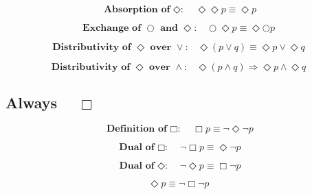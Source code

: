 \documentclass[fleqn, leqno]{article}
\newcommand{\Next}{\bigcirc}
\newcommand{\Event}{\Diamond}
\newcommand{\Always}{\Box}
\newcommand{\spacer}{\vspace{-30pt}}
\newcommand{\firstspacer}{\vspace{-26pt}}
\begin{document}
\spacer

\begin{equation}\label{E:IdemEvent}
\textbf{Absorption of $\Event$:}\quad \Event\Event p \equiv \Event p
\end{equation}

\spacer

\begin{equation}\label{E:dNextEvent}
\textbf{Exchange of $\Next$ and $\Event$:}\quad \Next\Event p \equiv \Event\Next p
\end{equation}

\spacer

\begin{equation}\label{E:distEventOr}
\textbf{Distributivity of $\Event$ over $\lor$:}\quad \Event(p \lor q) \equiv \Event p \lor \Event q
\end{equation}

\spacer

\begin{equation}\label{E:distEventAnd}
\textbf{Distributivity of $\Event$ over $\land$:}\quad \Event(p \land q) \Rightarrow \Event p \land \Event q
\end{equation}

\pagebreak

\subsection*{Always $\quad\Always$}

\begin{equation}\label{E:defAlways}
\textbf{Definition of $\Always$:}\quad \Always p \equiv \lnot\Event\lnot p
\end{equation}

\firstspacer

\begin{equation}\label{E:dualAlways}
\textbf{Dual of $\Always$:}\quad \lnot\Always p \equiv \Event\lnot p
\end{equation}

\spacer

\begin{equation}\label{E:dualEvent}
\textbf{Dual of $\Event$:}\quad \lnot\Event p \equiv \Always\lnot p
\end{equation}

\spacer

\begin{equation}\label{E:eventAsAlways}
\Event p \equiv \lnot\Always\lnot p
\end{equation}
\end{document}
